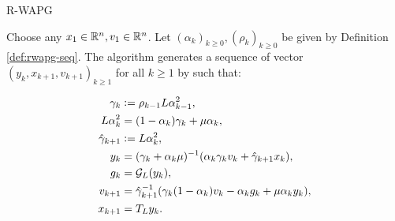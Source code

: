 \documentclass[11pt]{beamer}
\theoremstyle{definition}
\begin{document}
        \begin{frame}{R-WAPG}
            \begin{definition}\label{def:wapg}
                Choose any $x_1 \in \mathbb R^n, v_1 \in \mathbb R^n$.
                Let $(\alpha_k)_{k \ge0}, (\rho_k)_{k \ge 0}$ be given by Definition \ref{def:rwapg-seq}.
                The algorithm generates a sequence of vector $(y_k, x_{k + 1}, v_{k + 1})_{k \ge 1}$ for all $k\ge 1$ by such that:
                \begin{tcolorbox}\vspace{-1em}
                    \begin{align*}
                        \gamma_k &\vcentcolon= \rho_{k -1}L\alpha_{k - 1}^2,
                        \\
                        L\alpha_k^2 &= (1 - \alpha_k)\gamma_k + \mu \alpha_k, 
                        \\
                        \hat \gamma_{k + 1} & \vcentcolon= L\alpha_k^2,
                        \\
                        y_k &=
                        (\gamma_k + \alpha_k \mu)^{-1}(\alpha_k \gamma_k v_k + \hat\gamma_{k + 1} x_k),
                        \\
                        g_k &= \mathcal G_L (y_k),
                        \\
                        v_{k + 1} &=
                        \hat\gamma^{-1}_{k + 1}
                        (\gamma_k(1 - \alpha_k) v_k - \alpha_k g_k + \mu \alpha_k y_k),
                        \\
                        x_{k + 1} &= T_L y_k.
                    \end{align*}
                \end{tcolorbox}
            \end{definition}
        \end{frame}
\end{document}
